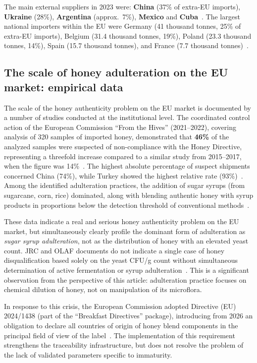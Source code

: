 The main external suppliers in 2023 were:
\textbf{China} (37\% of extra-EU imports), \textbf{Ukraine} (28\%),
\textbf{Argentina} (approx.\ 7\%), \textbf{Mexico} and
\textbf{Cuba}~\cite{tridge2024}.
The largest national importers within the EU were Germany
(41 thousand tonnes, 25\% of extra-EU imports), Belgium
(31.4 thousand tonnes, 19\%), Poland (23.3 thousand tonnes, 14\%),
Spain (15.7 thousand tonnes), and France
(7.7 thousand tonnes)~\cite{eurostat_honey2023}.

\subsection{The scale of honey adulteration on the EU market: empirical data}

The scale of the honey authenticity problem on the EU market is
documented by a number of studies conducted at the institutional
level. The coordinated control action of the European Commission
``From the Hives'' (2021--2022), covering analysis of 320 samples
of imported honey, demonstrated that \textbf{46\%} of the analyzed
samples were suspected of non-compliance with the Honey Directive,
representing a threefold increase compared to a similar study from
2015--2017, when the figure was 14\%~\cite{eufromhives2021}.
The highest absolute percentage of suspect shipments concerned China
(74\%), while Turkey showed the highest relative rate
(93\%)~\cite{eufromhives2021}. Among the identified adulteration
practices, the addition of sugar syrups (from sugarcane, corn, rice)
dominated, along with blending authentic honey with syrup products
in proportions below the detection threshold of conventional
methods~\cite{eufromhives2021,schoder2026}.

These data indicate a real and serious honey authenticity problem
on the EU market, but simultaneously clearly profile the dominant
form of adulteration as \emph{sugar syrup adulteration}, not as
the distribution of honey with an elevated yeast count. JRC and OLAF
documents do not indicate a single case of honey disqualification
based solely on the yeast CFU/g count without simultaneous
determination of active fermentation or syrup
adulteration~\cite{eufromhives2021}. This is a significant
observation from the perspective of this article: adulteration
practice focuses on chemical dilution of honey, not on manipulation
of its microflora.

In response to this crisis, the European Commission adopted
Directive (EU) 2024/1438 (part of the ``Breakfast Directives''
package), introducing from 2026 an obligation to declare all
countries of origin of honey blend components in the principal
field of view of the label~\cite{cbi_traceability2024}. The
implementation of this requirement strengthens the traceability
infrastructure, but does not resolve the problem of the lack of
validated parameters specific to immaturity.

